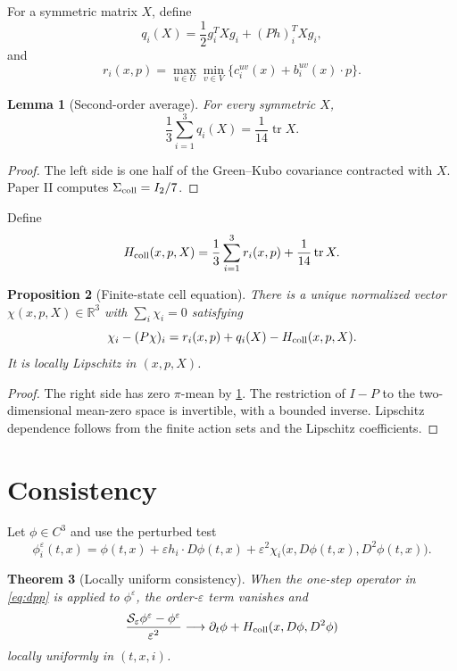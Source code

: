 \documentclass[11pt,reqno]{amsart}
\newtheorem{theorem}{Theorem}[section]
\newtheorem{proposition}[theorem]{Proposition}
\newtheorem{lemma}[theorem]{Lemma}
\theoremstyle{definition}
\theoremstyle{remark}
\newcommand{\R}{\mathbb R}
\newcommand{\tr}{\operatorname{tr}}
\begin{document}
For a symmetric matrix $X$, define
\[
 q_i(X)
 =
 \frac12g_i^TXg_i+(Ph)_i^TXg_i,
\]
and
\[
 r_i(x,p)
 =
 \max_{u\in U}\min_{v\in V}
 \{c_i^{uv}(x)+b_i^{uv}(x)\cdot p\}.
\]

\begin{lemma}[Second-order average]\label{lem:average}
For every symmetric $X$,
\[
 \frac13\sum_{i=1}^3q_i(X)
 =\frac1{14}\tr X.
\]
\end{lemma}

\begin{proof}
The left side is one half of the Green--Kubo covariance contracted with $X$.
Paper II computes $\Sigma_{\rm coll}=I_2/7$.
\end{proof}

Define
\begin{equation}\label{eq:Hcoll}
 H_{\rm coll}(x,p,X)
 =
 \frac13\sum_{i=1}^3r_i(x,p)+\frac1{14}\tr X.
\end{equation}

\begin{proposition}[Finite-state cell equation]\label{prop:cell}
There is a unique normalized vector $\chi(x,p,X)\in\R^3$ with
$\sum_i\chi_i=0$ satisfying
\[
 \chi_i-(P\chi)_i
 =
 r_i(x,p)+q_i(X)-H_{\rm coll}(x,p,X).
\]
It is locally Lipschitz in $(x,p,X)$.
\end{proposition}

\begin{proof}
The right side has zero $\pi$-mean by \cref{lem:average}.  The restriction of
$I-P$ to the two-dimensional mean-zero space is invertible, with a bounded
inverse.  Lipschitz dependence follows from the finite action sets and the
Lipschitz coefficients.
\end{proof}

\section{Consistency}\label{sec:consistency}

Let $\phi\in C^3$ and use the perturbed test
\[
 \phi_i^\varepsilon(t,x)
 =
 \phi(t,x)
 +\varepsilon h_i\cdot D\phi(t,x)
 +\varepsilon^2\chi_i
 \bigl(x,D\phi(t,x),D^2\phi(t,x)\bigr).
\]

\begin{theorem}[Locally uniform consistency]\label{thm:consistency}
When the one-step operator in \eqref{eq:dpp} is applied to
$\phi^\varepsilon$, the order-$\varepsilon$ term vanishes and
\[
 \frac{\mathcal S_\varepsilon\phi^\varepsilon-\phi^\varepsilon}
 {\varepsilon^2}
 \longrightarrow
 \partial_t\phi+
 H_{\rm coll}(x,D\phi,D^2\phi)
\]
locally uniformly in $(t,x,i)$.
\end{theorem}
\end{document}
